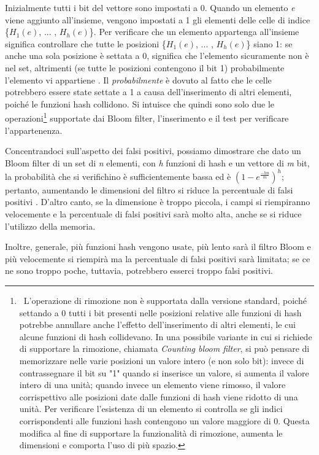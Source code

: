 \documentclass[../main.tex]{subfiles}
\begin{document}
\noindent
Inizialmente tutti i bit del vettore sono impostati a 0. Quando un elemento \textit{e} viene aggiunto all'insieme, vengono impostati a 1 gli elementi delle celle di indice \{$H_{1}(e)$, ... , $H_{h}(e)$\}. Per verificare che un elemento appartenga all'insieme significa controllare che tutte le posizioni \{$H_{1}(e)$, ... , $H_{h}(e)$\} siano 1: se anche una sola posizione è settata a 0, significa che l'elemento sicuramente non è nel set, altrimenti (se tutte le posizioni contengono il bit 1) probabilmente l'elemento vi appartiene \cite{compressedbloomfilter}. Il \textit{probabilmente} è dovuto al fatto che le celle potrebbero essere state settate a 1 a causa dell'inserimento di altri elementi, poiché le funzioni hash collidono. Si intuisce che quindi sono solo due le operazioni\footnote{\ L'operazione di rimozione non è supportata dalla versione standard, poiché settando a 0 tutti i bit presenti nelle posizioni relative alle funzioni di hash potrebbe annullare anche l'effetto dell'inserimento di altri elementi, le cui alcune funzioni di hash collidevano. In una possibile variante in cui si richiede di supportare la rimozione, chiamata \textit{Counting bloom filter}, si può pensare di memorizzare nelle varie posizioni un valore intero (e non solo bit): invece di contrassegnare il bit su "1" quando si inserisce un valore, si aumenta il valore intero di una unità; quando invece un elemento viene rimosso, il valore corrispettivo alle posizioni date dalle funzioni di hash viene ridotto di una unità. Per verificare l'esistenza di un elemento si controlla se gli indici corrispondenti alle funzioni hash contengono un valore maggiore di 0. Questa modifica al fine di supportare la funzionalità di rimozione, aumenta le dimensioni e comporta l'uso di più spazio.} supportate dai Bloom filter, l'inserimento e il test per verificare l'appartenenza.

Concentrandoci sull'aspetto dei falsi positivi, possiamo dimostrare che dato un Bloom filter di un set di \textit{n} elementi, con \textit{h} funzioni di hash e un vettore di \textit{m} bit, la probabilità che si verifichino è sufficientemente bassa ed è $(1 - e^{\frac{-hn}{m}})^{h} $; pertanto, aumentando le dimensioni del filtro si riduce la percentuale di falsi positivi \cite{bernardini2019malva} \cite{compressedbloomfilter}. D'altro canto, se la dimensione è troppo piccola, i campi si riempiranno velocemente e la percentuale di falsi positivi sarà molto alta, anche se si riduce l'utilizzo della memoria. 

Inoltre, generale, più funzioni hash vengono usate, più lento sarà il filtro Bloom e più velocemente si riempirà ma la percentuale di falsi positivi sarà limitata; se ce ne sono troppo poche, tuttavia, potrebbero esserci troppo falsi positivi.
\end{document}
